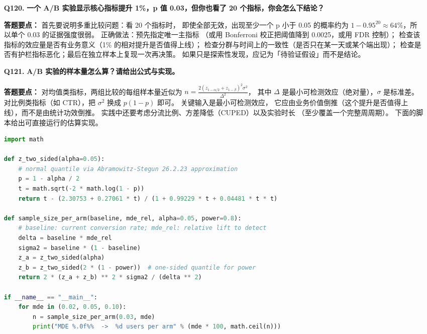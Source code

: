 \begin{interview}[题库与答题要点]
\begin{enumerate}[label=]
  \item[\textcolor{VioletDeep}{\textbf{Q120.}}] \textbf{一个 A/B 实验显示核心指标提升 1\%，p 值 0.03，但你也看了 20 个指标，你会怎么下结论？}
\par\smallskip\noindent\textcolor{VioletDeep}{\textbf{答题要点：}}
首先要说明多重比较问题：看 20 个指标时，
即使全部无效，出现至少一个 p 小于 0.05 的概率约为
$1-0.95^{20}\approx 64\%$，所以单个 0.03 的证据强度很弱。
正确做法：预先指定唯一主指标
（或用 Bonferroni 校正把阈值降到 0.0025，或用 FDR 控制）；
检查该指标的效应量是否有业务意义（1\% 的相对提升是否值得上线）；
检查分群与时间上的一致性（是否只在某一天或某个端出现）；
检查是否有护栏指标恶化；最后在独立样本上复现一次再决策。
如果只是探索性发现，应记为「待验证假设」而不是结论。

  \item[\textcolor{VioletDeep}{\textbf{Q121.}}] \textbf{A/B 实验的样本量怎么算？请给出公式与实现。}
\par\smallskip\noindent\textcolor{VioletDeep}{\textbf{答题要点：}}
对均值类指标，两组比较的每组样本量近似为
$n = \frac{2(z_{1-\alpha/2}+z_{1-\beta})^2\sigma^2}{\Delta^2}$，
其中 $\Delta$ 是最小可检测效应（绝对量），$\sigma$ 是标准差。
对比例类指标（如 CTR），把 $\sigma^2$ 换成 $p(1-p)$ 即可。
关键输入是最小可检测效应，
它应由业务价值倒推（这个提升是否值得上线），而不是由统计功效倒推。
实践中还要考虑分流比例、方差降低（CUPED）以及实验时长
（至少覆盖一个完整周周期）。
下面的脚本给出可直接运行的估算实现。

\begin{lstlisting}[style=growth, language=Python, caption={A/B 实验样本量与最小可检测效应的快速估算（示意代码）}]
import math

def z_two_sided(alpha=0.05):
    # normal quantile via Abramowitz-Stegun 26.2.23 approximation
    p = 1 - alpha / 2
    t = math.sqrt(-2 * math.log(1 - p))
    return t - (2.30753 + 0.27061 * t) / (1 + 0.99229 * t + 0.04481 * t * t)

def sample_size_per_arm(baseline, mde_rel, alpha=0.05, power=0.8):
    # baseline: current conversion rate; mde_rel: relative lift to detect
    delta = baseline * mde_rel
    sigma2 = baseline * (1 - baseline)
    z_a = z_two_sided(alpha)
    z_b = z_two_sided(2 * (1 - power))  # one-sided quantile for power
    return 2 * (z_a + z_b) ** 2 * sigma2 / (delta ** 2)

if __name__ == "__main__":
    for mde in (0.02, 0.05, 0.10):
        n = sample_size_per_arm(0.03, mde)
        print("MDE %.0f%%  ->  %d users per arm" % (mde * 100, math.ceil(n)))
\end{lstlisting}


\end{enumerate}
\end{interview}
